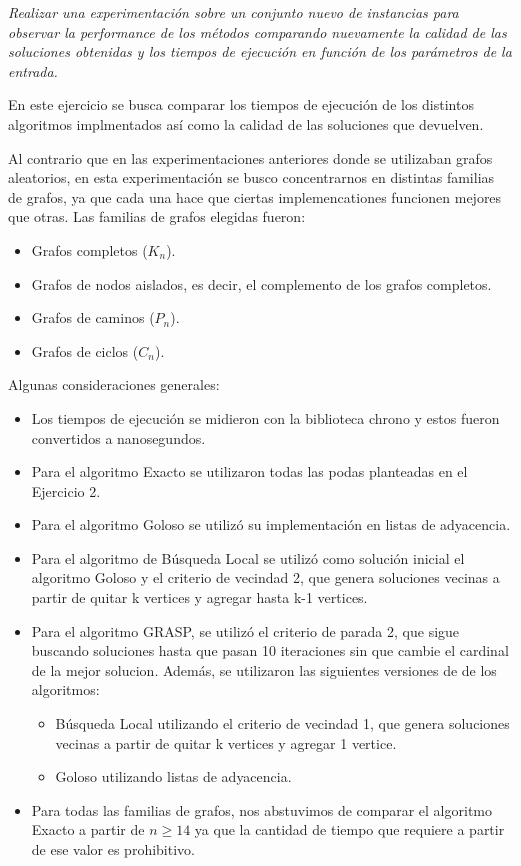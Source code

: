 \textit{Realizar una experimentación sobre un conjunto nuevo de instancias para observar la performance de los métodos comparando nuevamente la calidad de las soluciones obtenidas y los tiempos de ejecución en función de los parámetros de la entrada.}
\medskip

En este ejercicio se busca comparar los tiempos de ejecución de los distintos algoritmos implmentados así como la calidad de las soluciones que devuelven.

Al contrario que en las experimentaciones anteriores donde se utilizaban grafos aleatorios, en esta experimentación se busco concentrarnos en distintas familias de grafos, ya que cada una hace que ciertas implemencationes funcionen mejores que otras. Las familias de grafos elegidas fueron:
\begin{itemize}
    \item Grafos completos ($K_n$).
    \item Grafos de nodos aislados, es decir, el complemento de los grafos completos.
    \item Grafos de caminos ($P_n$).
    \item Grafos de ciclos ($C_n$).
\end{itemize}

Algunas consideraciones generales:
\begin{itemize}
    \item Los tiempos de ejecución se midieron con la biblioteca chrono y estos fueron convertidos a nanosegundos.
    \item Para el algoritmo Exacto se utilizaron todas las podas planteadas en el Ejercicio 2.
    \item Para el algoritmo Goloso se utilizó su implementación en listas de adyacencia.
    \item Para el algoritmo de Búsqueda Local se utilizó como solución inicial el algoritmo Goloso y el criterio de vecindad 2, que genera soluciones vecinas a partir de quitar k vertices y agregar hasta k-1 vertices.
    \item Para el algoritmo GRASP, se utilizó el criterio de parada 2, que sigue buscando soluciones hasta que pasan 10 iteraciones sin que cambie el cardinal de la mejor solucion. Además, se utilizaron las siguientes versiones de de los algoritmos:
        \begin{itemize}
            \item Búsqueda Local utilizando el criterio de vecindad 1, que genera soluciones vecinas a partir de quitar k vertices y agregar 1 vertice.
            \item Goloso utilizando listas de adyacencia.
        \end{itemize}
    \item Para todas las familias de grafos, nos abstuvimos de comparar el algoritmo Exacto a partir de $n \geq 14$ ya que la cantidad de tiempo que requiere a partir de ese valor es prohibitivo.
\end{itemize}

